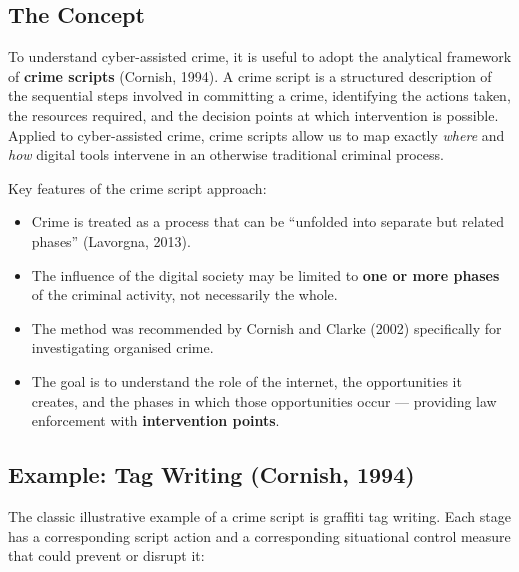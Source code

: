 \documentclass[11pt,a4paper,openany]{report}
\theoremstyle{definition}
\theoremstyle{plain}
\theoremstyle{remark}
\begin{document}
\subsection{The Concept}

To understand cyber-assisted crime, it is useful to adopt the analytical framework of \textbf{crime scripts} (Cornish, 1994). A crime script is a structured description of the sequential steps involved in committing a crime, identifying the actions taken, the resources required, and the decision points at which intervention is possible. Applied to cyber-assisted crime, crime scripts allow us to map exactly \textit{where} and \textit{how} digital tools intervene in an otherwise traditional criminal process.

Key features of the crime script approach:

\begin{itemize}
    \item Crime is treated as a process that can be ``unfolded into separate but related phases'' (Lavorgna, 2013).
    \item The influence of the digital society may be limited to \textbf{one or more phases} of the criminal activity, not necessarily the whole.
    \item The method was recommended by Cornish and Clarke (2002) specifically for investigating organised crime.
    \item The goal is to understand the role of the internet, the opportunities it creates, and the phases in which those opportunities occur --- providing law enforcement with \textbf{intervention points}.
\end{itemize}

\subsection{Example: Tag Writing (Cornish, 1994)}

The classic illustrative example of a crime script is graffiti tag writing. Each stage has a corresponding script action and a corresponding situational control measure that could prevent or disrupt it:
\end{document}
